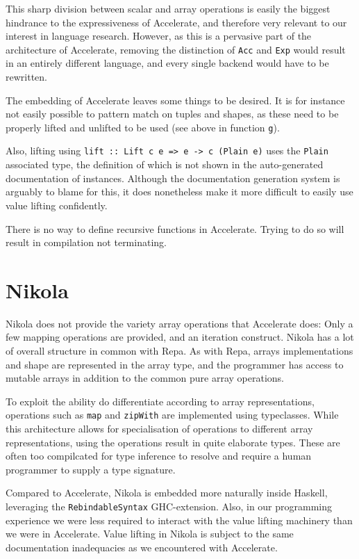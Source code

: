 This sharp division between scalar and array operations is easily the biggest
hindrance to the expressiveness of Accelerate, and therefore very relevant to
our interest in language research. However, as this is a pervasive part of the
architecture of Accelerate, removing the distinction of \texttt{Acc} and
\texttt{Exp} would result in an entirely different language, and every single
backend would have to be rewritten.


The embedding of Accelerate leaves some things to be desired. It is for
instance not easily possible to pattern match on tuples and shapes, as these
need to be properly lifted and unlifted to be used (see above in function \texttt{g}).

Also, lifting using \texttt{lift :: Lift c e => e -> c (Plain e)} uses the
\texttt{Plain} associated type, the definition of which is not shown in the
auto-generated documentation of instances. Although the documentation
generation system is arguably to blame for this, it does nonetheless make it
more difficult to easily use value lifting confidently.

There is no way to define recursive functions in Accelerate. Trying to do so
will result in compilation not terminating.

\section{Nikola}

Nikola does not provide the variety array operations that Accelerate does: Only
a few mapping operations are provided, and an iteration construct.  Nikola has
a lot of overall structure in common with Repa. As with Repa, arrays
implementations and shape are represented in the array type, and the programmer
has access to mutable arrays in addition to the common pure array operations.

To exploit the ability do differentiate according to array representations,
operations such as \texttt{map} and \texttt{zipWith} are implemented using
typeclasses.  While this architecture allows for specialisation of operations
to different array representations, using the operations result in quite
elaborate types. These are often too compilcated for type inference to resolve
and require a human programmer to supply a type signature.


Compared to Accelerate, Nikola is embedded more naturally inside Haskell,
leveraging the \texttt{RebindableSyntax} GHC-extension. Also, in our programming
experience we were less required to interact with the value lifting machinery
than we were in Accelerate. Value lifting in Nikola is subject to the same
documentation inadequacies as we encountered with Accelerate.

